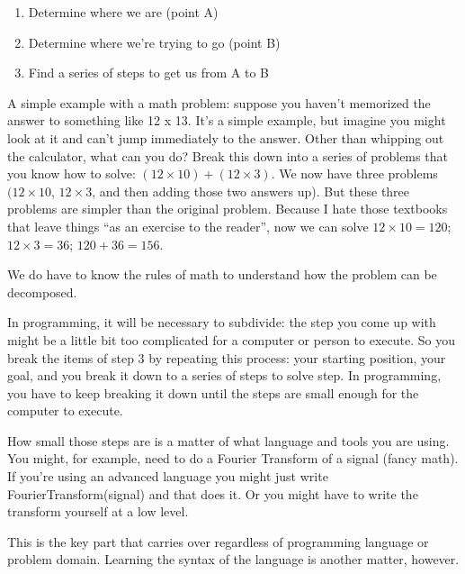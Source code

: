 \begin{enumerate}
\item Determine where we are (point A)
\item Determine where we're trying to go (point B)
\item Find a series of steps to get us from A to B 
\end{enumerate}

A simple example with a math problem: suppose you haven't memorized the answer to something like 12 x 13. It's a simple example, but imagine you might look at it and can't jump immediately to the answer. Other than whipping out the calculator, what can you do? Break this down into a series of problems that you know how to solve: $(12 \times 10) + (12 \times 3)$. We now have three problems $(12 \times 10$, $12 \times 3$, and then adding those two answers up). But these three problems are simpler than the original problem. Because I hate those textbooks that leave things ``as an exercise to the reader'', now we can solve $12 \times 10 = 120$; $12 \times 3 = 36$; $120 + 36 = 156$. 

We do have to know the rules of math to understand how the problem can be decomposed. 

In programming, it will be necessary to subdivide: the step you come up with might be a little bit too complicated for a computer or person to execute. So you break the items of step 3 by repeating this process: your starting position, your goal, and you break it down to a series of steps to solve step. In programming, you have to keep breaking it down until the steps are small enough for the computer to execute.

How small those steps are is a matter of what language and tools you are using. You might, for example, need to do a Fourier Transform of a signal (fancy math). If you're using an advanced language you might just write FourierTransform(signal) and that does it. Or you might have to write the transform yourself at a low level.

This is the key part that carries over regardless of programming language or problem domain. Learning the syntax of the language is another matter, however.



